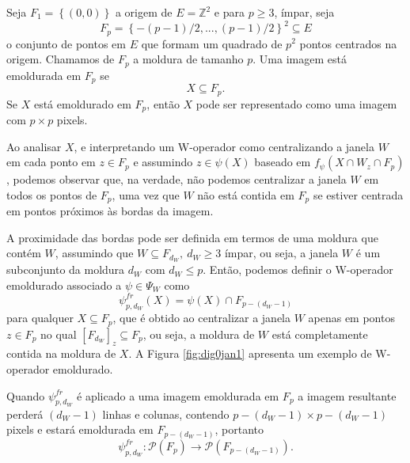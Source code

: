Seja $F_{1} = \left\{ \left( 0,0 \right) \right\}$ a origem de $E = \mathbb{Z}^{2}$ e para $p \geq 3$, ímpar, seja
$$F_{p} = \left\{ - \left(p-1 \right) /2 , ... , \left( p-1 \right) /2 \right\}^{2} \subseteq E $$
o conjunto de pontos em $E$ que formam um quadrado de $p^{2}$ pontos centrados na origem. Chamamos de $F_{p}$ a moldura de tamanho $p$. Uma imagem está emoldurada em $F_{p}$ se
$$X \subseteq F_{p}.$$
Se $X$ está emoldurado em $F_{p}$, então $X$ pode ser representado como uma imagem com $p \times p$ pixels.

Ao analisar $X$, e interpretando um W-operador como centralizando a janela $W$ em cada ponto em $z \in F_{p}$ e assumindo $z \in \psi \left( X \right)$ baseado em $f_{\psi} \left( X \cap W_{z} \cap F_{p} \right)$, podemos observar que, na verdade, não podemos centralizar a janela $W$ em todos os pontos de $F_{p}$, uma vez que $W$ não está contida em $F_{p}$ se estiver centrada em pontos próximos às bordas da imagem.

A proximidade das bordas pode ser definida em termos de uma moldura que contém $W$, assumindo que $W \subseteq F_{d_{W}}, \ d_{W} \geq 3$ ímpar, ou seja, a janela $W$ é um subconjunto da moldura $d_{W}$ com $d_{W} \leq p$. Então, podemos definir o W-operador emoldurado associado a $\psi \in \Psi_{W}$ como
\begin{equation}
    \psi_{p,d_{W}}^{fr} \left( X \right) = \psi \left( X \right) \cap F_{p-(d_{W}-1)}
    \label{eq:wemoldurado}
\end{equation}
para qualquer $X \subseteq F_{p}$, que é obtido ao centralizar a janela $W$ apenas em pontos $z \in F_{p}$ no qual $ \left[ F_{d_{W}} \right]_{z} \subseteq F_{p} $, ou seja, a moldura de $W$ está completamente contida na moldura de $X$. A Figura \ref{fig:dig0jan1} apresenta um exemplo de W-operador emoldurado.

Quando $\psi_{p,d_{W}}^{fr}$ é aplicado a uma imagem emoldurada em $F_{p}$ a imagem resultante perderá $\left( d_{W}-1 \right)$ linhas e colunas, contendo $p- \left( d_{W}-1 \right) \times p- \left( d_{W}-1 \right)$ pixels e estará emoldurada em $ F_{p-(d_{W}-1)}$, portanto
$$\psi_{p,d_{W}}^{fr} : \mathcal{P} \left( F_{p} \right) \to  \mathcal{P} \left( F_{p-(d_{W}-1)} \right). $$


